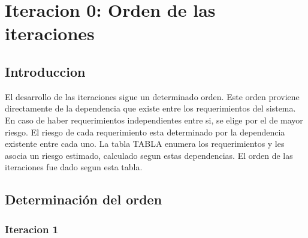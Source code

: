 \chapter{Iteracion 0: Orden de las iteraciones} %
\label{cha:iteracion_0}

\section{Introduccion} %
\label{it0:sec:introduccion}

El desarrollo de las iteraciones sigue un determinado orden. Este orden proviene directamente de la dependencia que existe entre los requerimientos del sistema. En caso de haber requerimientos independientes entre si, se elige por el de mayor riesgo. El riesgo de cada requerimiento esta determinado por la dependencia existente entre cada uno. La tabla TABLA enumera los requerimientos y les asocia un riesgo estimado, calculado segun estas dependencias. El orden de las iteraciones fue dado segun esta tabla.



\section{Determinación del orden} %
\label{it0:sec:determinacion_del_orden}

\subsection{Iteracion 1} %
\label{sub:iteracion_1}

